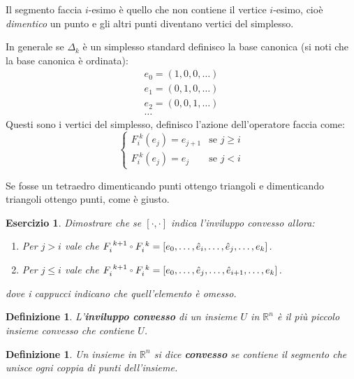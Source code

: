 \documentclass[10pt, twoside=false, x11names]{scrbook}
\newtheorem{definition}[theorem]{Definizione}
\newcounter{exercises}
\newtheorem{exercise}[exercises]{Esercizio}
\newcommand{\RN}[1][]{\mathbb{R}^#1}
\let\latexcirc=\circ
\newcommand{\ccirc}{\mathbin{\mathchoice
  {\xcirc\scriptstyle}
  {\xcirc\scriptstyle}
  {\xcirc\scriptscriptstyle}
  {\xcirc\scriptscriptstyle}
}}
\newcommand{\xcirc}[1]{\vcenter{\hbox{$#1\latexcirc$}}}
\let\circ\ccirc
\begin{document}
Il segmento faccia $ i $-esimo è quello che non contiene il vertice $ i $-esimo, cioè
\emph{dimentico} un punto e gli altri punti diventano vertici del simplesso.

In generale se $ \Delta_k $ è un simplesso standard definisco la base canonica (si noti
che la base canonica è ordinata):
\begin{gather*}
  e_0 = (1,0,0,\dots)                            \\
  e_1 = (0,1,0,\dots)                            \\
  e_2 = (0,0,1,\dots)                            \\
  \dots
\end{gather*}
Questi sono i vertici del simplesso, definisco l'azione dell'operatore faccia
come:
\[
  \begin{cases}
    F_i^{\; k}(e_j) = e_{j+1}     & \text{se } j \geq i \\
    F_i^{\; k}(e_j) = e_{j} & \text{se } j < i
  \end{cases}
\]

Se fosse un tetraedro dimenticando punti ottengo triangoli e dimenticando
triangoli ottengo punti, come è giusto.

\begin{exercise}
  Dimostrare che se $ [\cdot, \cdot] $ indica l'inviluppo convesso allora:
  \begin{enumerate}
  \item Per $ j > i $ vale che $ F_i^{\; k+1} \circ F_i^{\; k} = [e_0, \dots, \hat{e}_i, \dots, \hat{e}_j, \dots, e_k ] $.
  \item Per $ j \leq i $ vale che $ F_i^{\; k+1} \circ F_i^{\; k} = [e_0, \dots, \hat{e}_j, \dots, \hat{e}_{i+1}, \dots, e_k ] $.
  \end{enumerate}
  dove i cappucci indicano che quell'elemento è omesso.
\end{exercise}

\begin{definition}
  L'\textbf{inviluppo convesso} di un insieme $ U $ in $ \RN{n} $ è il più piccolo
  insieme convesso che contiene $ U $.
\end{definition}
\begin{definition}
  Un insieme in $ \RN{n} $ si dice \textbf{convesso} se contiene
  il segmento che unisce ogni coppia di punti dell'insieme.
\end{definition}
\end{document}
